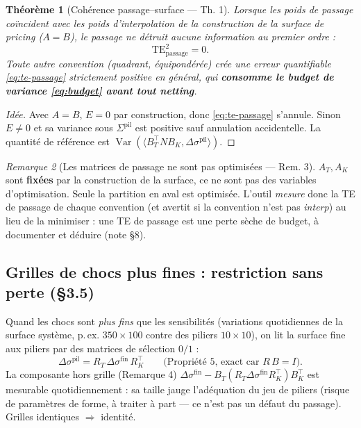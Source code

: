 \documentclass[11pt,a4paper]{article}
\DeclareMathOperator{\Var}{Var}
\newcommand{\dsig}{\Delta\sigma}
\theoremstyle{plain}
\newtheorem{theoreme}{Théorème}[section]
\theoremstyle{definition}
\theoremstyle{remark}
\newtheorem{remarque}[theoreme]{Remarque}
\begin{document}
\begin{theoreme}[Cohérence passage--surface --- Th. 1]\label{th:passage}
Lorsque les poids de passage coïncident avec les \emph{poids d'interpolation de la
construction de la surface de pricing} ($A=B$), le passage ne détruit aucune
information au premier ordre :
\[ \mathrm{TE}^2_{\mathrm{passage}} = 0. \]
Toute autre convention (quadrant, équipondérée) crée une erreur quantifiable
\eqref{eq:te-passage} strictement positive en général, qui \textbf{consomme le budget
de variance \eqref{eq:budget} avant tout netting}.
\end{theoreme}

\begin{proof}[Idée]
Avec $A=B$, $E=0$ par construction, donc \eqref{eq:te-passage} s'annule. Sinon $E\neq0$
et sa variance sous $\Sigma^{\mathrm{pil}}$ est positive sauf annulation accidentelle.
La quantité de référence est $\Var(\langle B_T^\top N B_K, \dsig^{\mathrm{pil}}\rangle)$.
\end{proof}

\begin{remarque}[Les matrices de passage ne sont pas optimisées --- Rem. 3]
$A_T,A_K$ sont \textbf{fixées} par la construction de la surface, ce ne sont pas des
variables d'optimisation. Seule la partition en aval est optimisée. L'outil \emph{mesure}
donc la TE de passage de chaque convention (et avertit si la convention n'est pas
\emph{interp}) au lieu de la minimiser : une TE de passage est une perte sèche de budget,
à documenter et déduire (note \S8).
\end{remarque}

\subsection{Grilles de chocs plus fines : restriction sans perte (\S3.5)}
Quand les chocs sont \emph{plus fins} que les sensibilités (variations quotidiennes de
la surface système, p.\,ex. $350\times100$ contre des piliers $10\times10$), on lit la
surface fine aux piliers par des matrices de sélection $0/1$ :
\begin{equation}
\dsig^{\mathrm{pil}} = R_T\, \dsig^{\mathrm{fin}}\, R_K^\top
\qquad\text{(Propriété 5, exact car $R\,B = I$).}
\end{equation}
La composante hors grille (Remarque 4)
$\dsig^{\mathrm{fin}} - B_T(R_T \dsig^{\mathrm{fin}} R_K^\top) B_K^\top$ est mesurable
quotidiennement : sa taille jauge l'adéquation du jeu de piliers (risque de paramètres
de forme, à traiter à part --- ce n'est pas un défaut du passage). Grilles identiques
$\Rightarrow$ identité.
\end{document}
